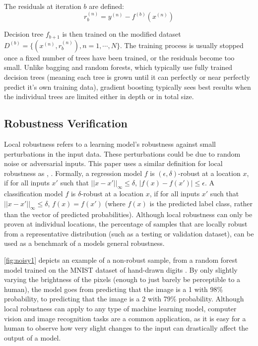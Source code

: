 \documentclass[pageno]{jpaper}
\begin{document}
\begin{doublespacing}
The residuals at iteration $b$ are defined:
$$r_b^{(n)} = y^{(n)} - f^{(b)}(x^{(n)})$$

Decision tree $f_{b + 1}$ is then trained on the modified dataset $D^{(b)} = \{ (x^{(n)}, r_b^{(n)}), n = 1, \cdots, N \}$. The training process is usually stopped once a fixed number of trees have been trained, or the residuals become too small. Unlike bagging and random forests, which typically use fully trained decision trees (meaning each tree is grown until it can perfectly or near perfectly predict it's own training data), gradient boosting typically sees best results when the individual trees are limited either in depth or in total size.

\subsection{Robustness Verification}
Local robustness refers to a learning model's robustness against small perturbations in the input data. These perturbations could be due to random noise or adversarial inputs. This paper uses a similar definition for local robustness as \cite{einziger}, \cite{katz}. Formally, a regression model $f$ is $(\epsilon, \delta)$-robust at a location $x$, if for all inputs $x'$ such that $||x - x'||_\infty \le \delta$, $|f(x) - f(x')| \le \epsilon$. A classification model $f$ is $\delta$-robust at a location $x$, if for all inputs $x'$ such that $||x - x'||_\infty \le \delta$, $f(x) = f(x')$ (where $f(x)$ is the predicted label class, rather than the vector of predicted probabilities). Although local robustness can only be proven at individual locations, the percentage of samples that are locally robust from a representative distribution (such as a testing or validation dataset), can be used as a benchmark of a models general robustness.

\autoref{fig:noisy1} depicts an example of a non-robust sample, from a random forest model trained on the MNIST dataset of hand-drawn digits \cite{mnist}. By only slightly varying the brightness of the pixels (enough to just barely be perceptible to a human), the model goes from predicting that the image is a 1 with 98\% probability, to predicting that the image is a 2 with 79\% probability. Although local robustness can apply to any type of machine learning model, computer vision and image recognition tasks are a common application, as it is easy for a human to observe how very slight changes to the input can drastically affect the output of a model.


\end{doublespacing}
\end{document}
